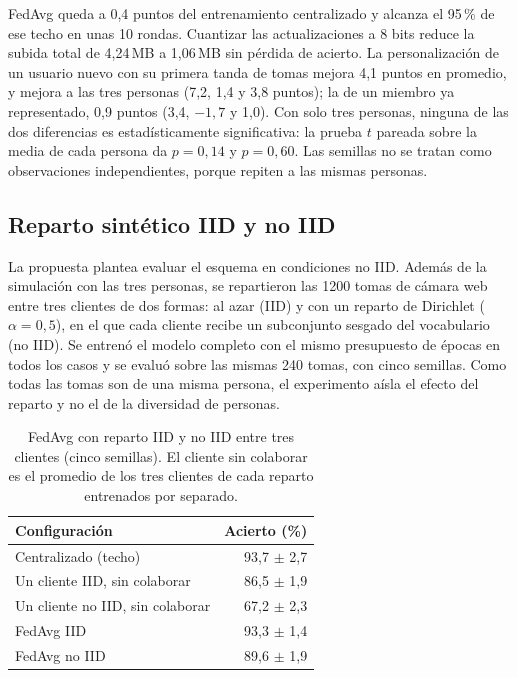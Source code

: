 FedAvg queda a 0,4 puntos del entrenamiento centralizado y alcanza el 95\,\% de ese techo en unas 10 rondas. Cuantizar las actualizaciones a 8 bits reduce la subida total de 4,24\,MB a 1,06\,MB sin pérdida de acierto. La personalización de un usuario nuevo con su primera tanda de tomas mejora 4,1 puntos en promedio, y mejora a las tres personas (7,2, 1,4 y 3,8 puntos); la de un miembro ya representado, 0,9 puntos (3,4, $-1{,}7$ y 1,0). Con solo tres personas, ninguna de las dos diferencias es estadísticamente significativa: la prueba $t$ pareada sobre la media de cada persona da $p = 0{,}14$ y $p = 0{,}60$. Las semillas no se tratan como observaciones independientes, porque repiten a las mismas personas.

\subsection{Reparto sintético IID y no IID}

La propuesta plantea evaluar el esquema en condiciones no IID. Además de la simulación con las tres personas, se repartieron las 1200 tomas de cámara web entre tres clientes de dos formas: al azar (IID) y con un reparto de Dirichlet ($\alpha = 0{,}5$), en el que cada cliente recibe un subconjunto sesgado del vocabulario (no IID). Se entrenó el modelo completo con el mismo presupuesto de épocas en todos los casos y se evaluó sobre las mismas 240 tomas, con cinco semillas. Como todas las tomas son de una misma persona, el experimento aísla el efecto del reparto y no el de la diversidad de personas.

\begin{table}[h]
    \centering
    \begin{tabular}{lr}
        \toprule
        Configuración & Acierto (\%) \\
        \midrule
        Centralizado (techo) & 93,7 $\pm$ 2,7 \\
        Un cliente IID, sin colaborar & 86,5 $\pm$ 1,9 \\
        Un cliente no IID, sin colaborar & 67,2 $\pm$ 2,3 \\
        FedAvg IID & 93,3 $\pm$ 1,4 \\
        FedAvg no IID & 89,6 $\pm$ 1,9 \\
        \bottomrule
    \end{tabular}
    \caption{FedAvg con reparto IID y no IID entre tres clientes (cinco semillas). El cliente sin colaborar es el promedio de los tres clientes de cada reparto entrenados por separado.}
    \label{tab:federado-niid}
\end{table}

